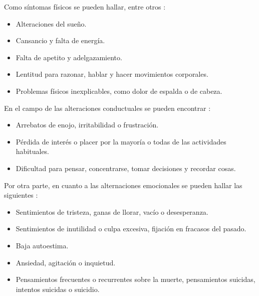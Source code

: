         Como síntomas físicos se pueden hallar, entre otros \cite{sawchuk_depresion_nodate} \cite{oms_depresion_2023}: 

        \begin{itemize}
            \item Alteraciones del sueño.
            \item Cansancio y falta de energía.    
            \item Falta de apetito y adelgazamiento.
            \item Lentitud para razonar, hablar y hacer movimientos corporales.
            \item Problemas físicos inexplicables, como dolor de espalda o de cabeza.
        \end{itemize}

        En el campo de las alteraciones conductuales se pueden encontrar  \cite{sawchuk_depresion_nodate} \cite{oms_depresion_2023}: 

        \begin{itemize}
            \item Arrebatos de enojo, irritabilidad o frustración.
            \item Pérdida de interés o placer por la mayoría o todas de las actividades habituales.
            \item Dificultad para pensar, concentrarse, tomar decisiones y recordar cosas.
        \end{itemize}
        
        Por otra parte, en cuanto a las alternaciones emocionales se pueden hallar las siguientes \cite{sawchuk_depresion_nodate} \cite{oms_depresion_2023}:

        \begin{itemize}
            \item Sentimientos de tristeza, ganas de llorar, vacío o desesperanza.
            \item Sentimientos de inutilidad o culpa excesiva, fijación en fracasos del pasado.
            \item Baja autoestima.
            \item Ansiedad, agitación o inquietud.
            \item Pensamientos frecuentes o recurrentes sobre la muerte, pensamientos suicidas, intentos suicidas o suicidio.
        \end{itemize}

